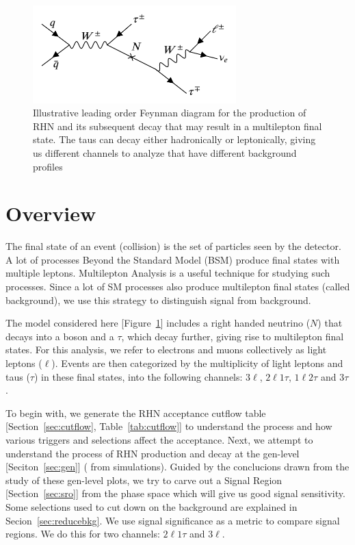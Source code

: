 \documentclass[letterpaper,12pt]{article}
\begin{document}
\begin{figure}[h!]
  \includegraphics[width=0.7\textwidth, center]{images/RHNfeynman.png}
  \caption{Illustrative leading order Feynman diagram for the production of RHN and its subsequent decay that may result in a multilepton final state. The taus can decay either hadronically or leptonically, giving us different channels to analyze that have different background profiles}
  \label{fig:rhnfeyn}
\end{figure}

\section{Overview}
\label{sec:overview}

The final state of an event (collision) is the set of particles seen by the detector. A lot of processes Beyond the Standard Model (BSM) produce final states with multiple leptons.  Multilepton Analysis is a useful technique for studying such processes. Since a lot of SM processes also produce multilepton final states (called background), we use this strategy to distinguish signal from background.

The model considered here [Figure~\ref{fig:rhnfeyn}] includes a right handed neutrino ($N$) that decays into a \Wboson{} boson and a $\tau$, which decay further, giving rise to multilepton final states. For this analysis, we refer to electrons and muons collectively as light leptons ($\ell$). Events are then categorized by the multiplicity of light leptons and taus ($\tau$) in these final states, into the following channels: $3\ell$, $2\ell1\tau$, $1\ell2\tau$ and $3\tau$.

To begin with, we generate the RHN acceptance cutflow table [Section~\ref{sec:cutflow}, Table~\ref{tab:cutflow}] to understand the process and how various triggers and selections affect the acceptance. Next, we attempt to understand the process of RHN production and decay at the gen-level [Seciton~\ref{sec:gen}] (\ie{} from simulations). Guided by the conclucions drawn from the study of these gen-level plots, we try to carve out a Signal Region [Section~\ref{sec:sro}] from the phase space which will give us good signal sensitivity. Some selections used to cut down on the background are explained in Secion~\ref{sec:reducebkg}. We use signal significance as a metric to compare signal regions. We do this for two channels: $2\ell1\tau$ and $3\ell$.
\end{document}
